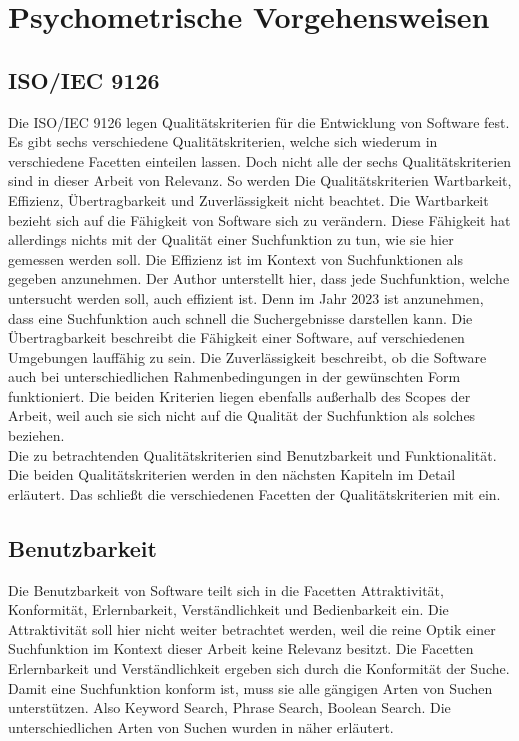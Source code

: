 \section{Psychometrische Vorgehensweisen}

\subsection{ISO/IEC 9126}
Die ISO/IEC 9126 legen Qualitätskriterien für die Entwicklung von Software fest.
Es gibt sechs verschiedene Qualitätskriterien, welche sich wiederum in verschiedene Facetten einteilen lassen.
Doch nicht alle der sechs Qualitätskriterien sind in dieser Arbeit von Relevanz.
So werden Die Qualitätskriterien Wartbarkeit, Effizienz, Übertragbarkeit und Zuverlässigkeit nicht beachtet.
Die Wartbarkeit bezieht sich auf die Fähigkeit von Software sich zu verändern.
Diese Fähigkeit hat allerdings nichts mit der Qualität einer Suchfunktion zu tun, wie sie hier gemessen werden soll.
Die Effizienz ist im Kontext von Suchfunktionen als gegeben anzunehmen.
Der Author unterstellt hier, dass jede Suchfunktion, welche untersucht werden soll, auch effizient ist.
Denn im Jahr 2023 ist anzunehmen, dass eine Suchfunktion auch schnell die Suchergebnisse darstellen kann.
Die Übertragbarkeit beschreibt die Fähigkeit einer Software, auf verschiedenen Umgebungen lauffähig zu sein.
Die Zuverlässigkeit beschreibt, ob die Software auch bei unterschiedlichen Rahmenbedingungen in der gewünschten Form funktioniert.
Die beiden Kriterien liegen ebenfalls außerhalb des Scopes der Arbeit, weil auch sie sich nicht auf die Qualität der Suchfunktion als solches beziehen.\\

Die zu betrachtenden Qualitätskriterien sind Benutzbarkeit und Funktionalität.
Die beiden Qualitätskriterien werden in den nächsten Kapiteln im Detail erläutert.
Das schließt die verschiedenen Facetten der Qualitätskriterien mit ein.

\subsection{Benutzbarkeit}
Die Benutzbarkeit von Software teilt sich in die Facetten Attraktivität, Konformität, Erlernbarkeit, Verständlichkeit und Bedienbarkeit ein.
Die Attraktivität soll hier nicht weiter betrachtet werden, weil die reine Optik einer Suchfunktion im Kontext dieser Arbeit keine Relevanz besitzt.
Die Facetten Erlernbarkeit und Verständlichkeit ergeben sich durch die Konformität der Suche.
Damit eine Suchfunktion konform ist, muss sie alle gängigen Arten von Suchen unterstützen.
Also Keyword Search, Phrase Search, Boolean Search.
Die unterschiedlichen Arten von Suchen wurden in  näher erläutert.\\

